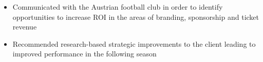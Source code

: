 \documentclass[9pt,a4paper,ragged2e]{altacv}
\begin{document}
    \divider

    \begin{itemize}
        \item Communicated with the Austrian football club in order to identify opportunities to increase ROI in the areas of branding, sponsorship and ticket revenue
        \item Recommended research-based strategic improvements to the client leading to improved performance in the following season
    \end{itemize}



    \bigskip\bigskip\bigskip


    \clearpage
\end{document}
